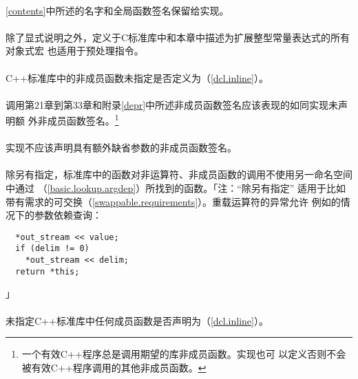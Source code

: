 \paragraph{}
\ref{contents}中所述的名字和全局函数签名保留给实现。

\paragraph{}
除了显式说明之外，定义于C标准库中和本章中描述为扩展整型常量表达式的所有对象式宏
也适用于预处理指令。

\paragraph{}
C++标准库中的非成员函数未指定是否定义为（\ref{dcl.inline}）。

\paragraph{}
调用第21章到第33章和附录\ref{depr}中所述非成员函数签名应该表现的如同实现未声明额
外非成员函数签名。\footnote{一个有效C++程序总是调用期望的库非成员函数。实现也可
以定义否则不会被有效C++程序调用的其他非成员函数。}

\paragraph{}
实现不应该声明具有额外缺省参数的非成员函数签名。

\paragraph{}
除另有指定，标准库中的函数对非运算符、非成员函数的调用不使用另一命名空间中通过
（\ref{basic.lookup.argdep}）所找到的函数。「注：“除另有指定”
适用于比如带有需求的可交换（\ref{swappable.requirements}）。重载运算符的异常允许
例如的情况下的参数依赖查询：                 \\
\begin{lstlisting}
  *out_stream << value;
  if (delim != 0)
    *out_stream << delim;
  return *this;
\end{lstlisting}」

\paragraph{}
未指定C++标准库中任何成员函数是否声明为（\ref{dcl.inline}）。

